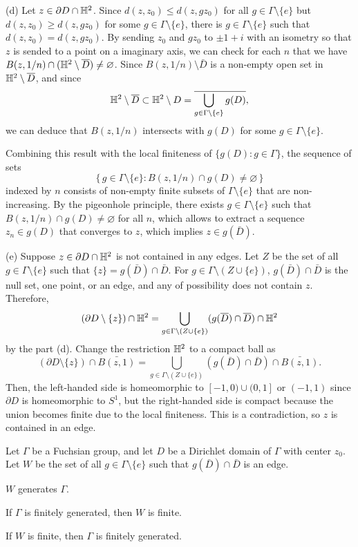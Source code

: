 \documentclass[a4paper]{article}
\begin{document}
\begin{pf}
(d)
Let $z\in\partial D\cap\mathbb{H}^2$.
Since $d(z,z_0)\le d(z,gz_0)$ for all $g\in\Gamma\setminus\{e\}$ but $d(z,z_0)\ge d(z,gz_0)$ for some $g\in\Gamma\setminus\{e\}$, there is $g\in\Gamma\setminus\{e\}$ such that $d(z,z_0)=d(z,gz_0)$.
By sending $z_0$ and $gz_0$ to $\pm1+i$ with an isometry so that $z$ is sended to a point on a imaginary axis, we can check for each $n$ that we have $B(z,1/n)\cap(\mathbb{H}^2\setminus\overline D)\ne\varnothing$.
Since $B(z,1/n)\setminus\bar D$ is a non-empty open set in $\mathbb{H}^2\setminus\overline D$, and since
\[\mathbb{H}^2\setminus\overline D\subset\mathbb{H}^2\setminus D=\overline{\bigcup_{g\in\Gamma\setminus\{e\}}g(D)},\]
we can deduce that $B(z,1/n)$ intersects with $g(D)$ for some $g\in\Gamma\setminus\{e\}$.

Combining this result with the local finiteness of $\{g(D):g\in\Gamma\}$, the sequence of sets
\[\{\,g\in\Gamma\setminus\{e\}:B(z,1/n)\cap g(D)\ne\varnothing\,\}\]
indexed by $n$ consists of non-empty finite subsets of $\Gamma\setminus\{e\}$ that are non-increasing.
By the pigeonhole principle, there exists $g\in\Gamma\setminus\{e\}$ such that $B(z,1/n)\cap g(D)\ne\varnothing$ for all $n$, which allows to extract a sequence $z_n\in g(D)$ that converges to $z$, which implies $z\in g(\bar D)$.

(e)
Suppose $z\in\partial D\cap\mathbb{H}^2$ is not contained in any edges.
Let $Z$ be the set of all $g\in\Gamma\setminus\{e\}$ such that $\{z\}=g(\bar D)\cap\bar D$.
For $g\in\Gamma\setminus(Z\cup\{e\})$, $g(\bar D)\cap\bar D$ is the null set, one point, or an edge, and any of possibility does not contain $z$.
Therefore,
\[(\partial D\setminus\{z\})\cap\mathbb{H}^2=\bigcup_{g\in\Gamma\setminus(Z\cup\{e\})}(g(\overline D)\cap\overline D)\cap\mathbb{H}^2\]
by the part (d).
Change the restriction $\mathbb{H}^2$ to a compact ball as
\[(\partial D\setminus\{z\})\cap\bar{B(z,1)}=\bigcup_{g\in\Gamma\setminus(Z\cup\{e\})}(g(\bar D)\cap\bar D)\cap\bar{B(z,1)}.\]
Then, the left-handed side is homeomorphic to $[-1,0)\cup(0,1]$ or $(-1,1)$ since $\partial D$ is homeomorphic to $S^1$, but the right-handed side is compact because the union becomes finite due to the local finiteness.
This is a contradiction, so $z$ is contained in an edge.
\end{pf}

\begin{prb}
Let $\Gamma$ be a Fuchsian group, and let $D$ be a Dirichlet domain of $\Gamma$ with center $z_0$.
Let $W$ be the set of all $g\in\Gamma\setminus\{e\}$ such that $g(\bar D)\cap\bar D$ is an edge.
\begin{parts}
\item $W$ generates $\Gamma$.
\item If $\Gamma$ is finitely generated, then $W$ is finite.
\item If $W$ is finite, then $\Gamma$ is finitely generated.
\end{parts}
\end{prb}
\end{document}
